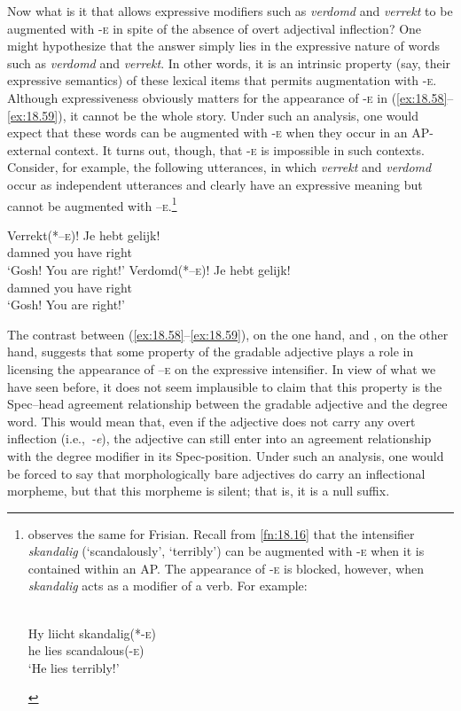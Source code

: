 \documentclass[output=paper]{langsci/langscibook}
\begin{document}
Now what is it that allows expressive modifiers such as \emph{verdomd} and
\emph{verrekt} to be augmented with \textsc{-e}  in spite of the absence of
overt adjectival inflection? One might hypothesize that the answer simply lies
in the expressive nature of words such as \emph{verdomd} and \emph{verrekt}. In
other words, it is an intrinsic property (say, their expressive semantics) of
these lexical items that permits augmentation with \textsc{-e}. Although
expressiveness obviously matters for the appearance of \textsc{-e} in
(\ref{ex:18.58}--\ref{ex:18.59}), it cannot be the whole story. Under such an analysis, one
would expect that these words can be augmented with \textsc{-e} when they occur
in an AP-external context. It turns out, though,  that \textsc{-e} is
impossible in such contexts. Consider, for example, the following utterances,
in which \emph{verrekt} and \emph{verdomd} occur as independent utterances and
clearly have an expressive meaning but cannot be augmented with
\textsc{–e.}\footnote{\citet{Verdenius1939} observes the same for Frisian.
    Recall from \cref{fn:18.16} that the intensifier \emph{skandalig}
    (\enquote*{scandalously}, \enquote*{terribly}) can be augmented with \textsc{-e} when
    it is contained within an AP. The appearance of \textsc{-e} is blocked,
    however, when \emph{skandalig} acts as a modifier of a verb. For example:

\begin{exe}
    \\
    \gll Hy liicht skandalig(*\textsc{-e})\\
    	 he lies scandalous(\textsc{-e})\\
    \glt \enquote*{He lies terribly!}
\end{exe}}

\ea%
    \label{ex:18.60}
	\ea
	\gll Verrekt(*\textsc{–e})!  Je      hebt    gelijk!\\
		damned            you  have  right\\
	\glt ‘Gosh! You are right!’
	\ex
	\gll Verdomd(*\textsc{–e})!  Je      hebt    gelijk!\\
		damned                you  have  right\\
	\glt ‘Gosh! You are right!’
	\z
\z

The contrast between (\ref{ex:18.58}--\ref{ex:18.59}), on the one hand, and
, on the other hand, suggests that some property of the gradable
adjective plays a role in licensing the appearance of  \textsc{–e} on the
expressive intensifier. In view of what we have seen before, it does not seem
implausible to claim that this property is the Spec--head agreement relationship
between the gradable adjective and the degree word. This would mean that, even
if the adjective does not carry any overt inflection (i.e.,~\mbox{\emph{-e}}), the
adjective can still enter into an agreement relationship with the degree
modifier in its Spec-position. Under such an analysis, one would be forced to
say that morphologically bare adjectives do carry an inflectional morpheme, but
that this morpheme is silent; that is, it is a null suffix.
\end{document}
